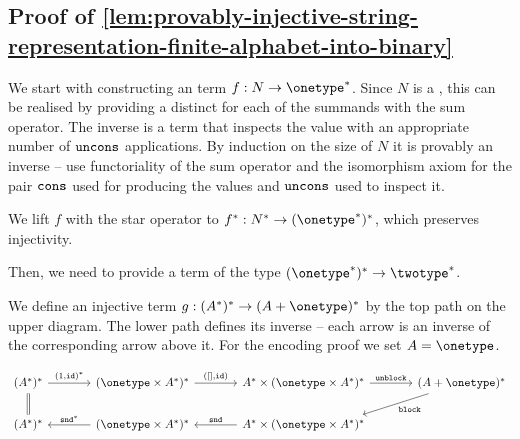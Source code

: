 \subsection{Proof of \cref{lem:provably-injective-string-representation-finite-alphabet-into-binary}}

We start with constructing an  term $f : N \to \onetype^*$. Since $N$ is a , this can be realised by providing a distinct  for each of the summands with the sum operator. 
The inverse is a term that inspects the value with an appropriate number of $\mathtt{uncons}$ applications. 
By induction on the size of $N$ it is provably an inverse -- use functoriality of the sum operator and the isomorphism axiom for the pair $\mathtt{cons}$ used for producing the values and $\mathtt{uncons}$ used to inspect it.   


We lift $f$ with the star operator to $f^* : N^* \to (\onetype^*)^*$, which preserves injectivity. 

Then, we need to provide a term of the type $(\onetype^*)^* \to \twotype^*$.

We define an injective term $g : (A^*)^* \to (A + \onetype)^*$ by the top path on the upper diagram.
The lower path defines its inverse -- each arrow is an inverse of the corresponding arrow above it. 
For the encoding proof we set $A=\onetype$.

\[
    \begin{tikzcd}[column sep=large]
    (A^*)^* 
    \ar[r, "\unitlterm^*"]
    &
    (\onetype \times A^*)^*
    \ar[r, "{([],\idterm)}"]
    &
    A^* \times (\onetype \times A^*)^*
    \ar[r, "\unblockterm"]
    &
    (A + \onetype)^*
    \ar[dl, "\blockterm", end anchor=10]
    \\
    (A^*)^* 
    \ar[u, equal]
    &
    (\onetype \times A^*)^*
    \ar[l, "\sndterm^*"']
    &
    A^* \times (\onetype \times A^*)^*
    \ar[l, "\sndterm"']
    \end{tikzcd}
\]

